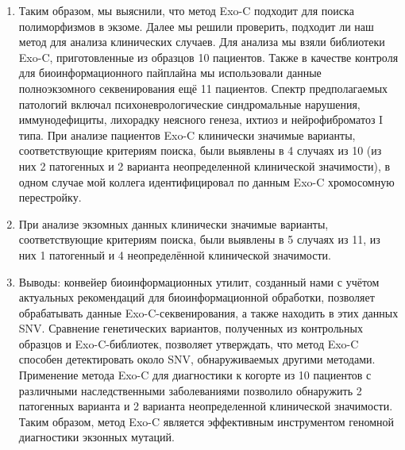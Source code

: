 \documentclass[a4paper,14pt]{extarticle}
\begin{document}
\begin{enumerate}
\item Таким образом, мы выяснили, что метод Exo-C подходит для поиска полиморфизмов в экзоме.
Далее мы решили проверить, подходит ли наш метод для анализа клинических случаев.
Для анализа мы взяли библиотеки Exo-C, приготовленные из образцов 10 пациентов.
Также в качестве контроля для биоинформационного пайплайна мы использовали данные полноэкзомного секвенирования ещё 11 пациентов.
Спектр предполагаемых патологий включал психоневрологические синдромальные нарушения, иммунодефициты, лихорадку неясного генеза, ихтиоз и нейрофиброматоз I типа.
При анализе пациентов Exo-C клинически значимые варианты, соответствующие критериям поиска, были выявлены в 4 случаях из 10 (из них 2 патогенных и 2 варианта неопределенной клинической значимости), в одном случае мой коллега идентифицировал по данным Exo-C хромосомную перестройку.

\item При анализе экзомных данных клинически значимые варианты, соответствующие критериям поиска, были выявлены в 5 случаях из 11, из них 1 патогенный и 4 неопределённой клинической значимости.

\item Выводы: конвейер биоинформационных утилит, созданный нами с учётом актуальных рекомендаций для биоинформационной обработки, позволяет обрабатывать данные Exo-C\hyp{}секвенирования, а также находить в этих данных SNV. Сравнение генетических вариантов, полученных из контрольных образцов и Exo-C\hyp{}библиотек, позволяет утверждать, что метод Exo-C способен детектировать около  SNV, обнаруживаемых другими методами. Применение метода Exo-C для диагностики к когорте из 10 пациентов с различными наследственными заболеваниями позволило обнаружить 2 патогенных варианта и 2 варианта неопределенной клинической значимости. Таким образом, метод Exo-C является эффективным инструментом геномной диагностики экзонных мутаций.

\end{enumerate}
\end{document}
